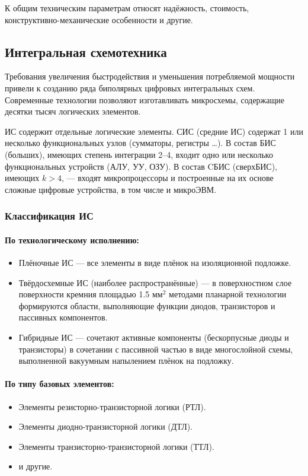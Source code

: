 \documentclass[10pt,a4paper,titlepage]{article}
\begin{document}
К общим техническим параметрам относят надёжность, стоимость, конструктивно-механические особенности и другие.

\subsection{Интегральная схемотехника}

Требования увеличения быстродействия и уменьшения потребляемой мощности привели к созданию ряда биполярных цифровых интегральных схем.
Современные технологии позволяют изготавливать микросхемы, содержащие десятки тысяч логических элементов.

ИС содержит отдельные логические элементы.
СИС (средние ИС) содержат 1 или несколько функциональных узлов (сумматоры, регистры \dots).
В состав БИС (больших), имеющих степень интеграции 2--4, входит одно или несколько функциональных устройств (АЛУ, УУ, ОЗУ).
В состав CБИС (сверхБИС), имеющих $k > 4$, --- входят микропроцессоры и построенные на их основе сложные цифровые устройства, в том числе и микроЭВМ.

\subsubsection{Классификация ИС}

\paragraph{По технологическому исполнению:}
\begin{itemize}
\item Плёночные ИС --- все элементы в виде плёнок на изоляционной подложке.
\item Твёрдосхемные ИС (наиболее распространённые) --- в поверхностном слое поверхности кремния площадью 1.5 мм$^2$ методами планарной технологии формируются области, выполняющие функции диодов, транзисторов и пассивных компонентов.
\item Гибридные ИС --- сочетают активные компоненты (бескорпусные диоды и транзисторы) в сочетании с пассивной частью в виде многослойной схемы, выполненной вакуумным напылением плёнок на подложку.
\end{itemize}

\paragraph{По типу базовых элементов:}
\begin{itemize}
\item Элементы резисторно-транзисторной логики (РТЛ).
\item Элементы диодно-транзисторной логики (ДТЛ).
\item Элементы транзисторно-транзисторной логики (ТТЛ).
\item и другие.
\end{itemize}
\end{document}

